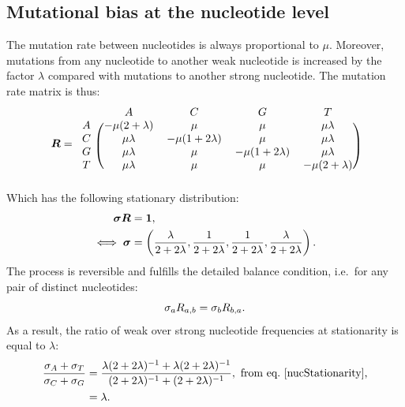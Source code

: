 \documentclass{article}
\begin{document}
\subsection{Mutational bias at the nucleotide level}
\label{sec:mut-bias-mut-matrix}
The mutation rate between nucleotides is always proportional to $\mu$.
Moreover, mutations from any nucleotide to another weak nucleotide is increased by the factor $\lambda$ compared with mutations to another strong nucleotide.
The mutation rate matrix is thus:
\begin{equation}
    \label{nucMatrix}
    \Mutmatrix =
    \begin{blockarray}{ccccc}
        & A & C & G & T \\
        \begin{block}{c(cccc)}
            A & {-\mu(2 + \lambda)} & {\mu} & {\mu} & {\mu \lambda} \\
            C & {\mu \lambda} & {-\mu(1 + 2\lambda)} & {\mu} & {\mu \lambda} \\
            G & {\mu \lambda} & {\mu} & {-\mu(1 + 2\lambda)} & {\mu \lambda} \\
            T & {\mu \lambda} & {\mu} & {\mu} & {-\mu(2 + \lambda)} \\
        \end{block}
    \end{blockarray}
\end{equation}
Which has the following stationary distribution:
\begin{align}
    \bm{\sigma} \bm{R} & = \bm{1}, \\
    \iff \bm{\sigma} & = \left( \dfrac{\lambda}{2+2\lambda}, \dfrac{1}{2+2\lambda}, \dfrac{1}{2+2\lambda}, \dfrac{\lambda}{2+2\lambda} \right).
    \label{nucStationarity}
\end{align}
The process is reversible and fulfills the detailed balance condition, i.e.~for any pair of distinct nucleotides:
\begin{equation}
    \sigma_a R_{a, b} =\sigma_b R_{b, a}.
    \label{nucMutBalance}
\end{equation}
As a result, the ratio of weak over strong nucleotide frequencies at stationarity is equal to $\lambda$:
\begin{align}
    \label{lambda}
    \dfrac{ \mutequi_A + \mutequi_T }{ \mutequi_C + \mutequi_G }
    & = \dfrac{ \lambda ( 2 + 2 \lambda)^{-1} + \lambda ( 2 + 2 \lambda)^{-1}}{ ( 2 + 2 \lambda)^{-1} + ( 2 + 2 \lambda)^{-1}}, \ \text{from eq.~\ref{nucStationarity},}\\
    & = \lambda.
\end{align}
\end{document}
